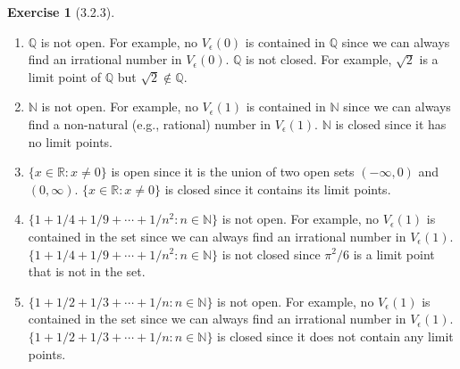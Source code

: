 \documentclass{amsart}
\theoremstyle{definition}
\newtheorem{exercise}{Exercise}
\newcommand{\N}{\mathbb{N}}
\newcommand{\Q}{\mathbb{Q}}
\newcommand{\R}{\mathbb{R}}
\newcommand{\st}{\mathrel{:}}
\begin{document}
\begin{exercise}[3.2.3]
  \begin{enumerate}[label={(\alph*)}]
    \item $\Q$ is not open. For example, no $V_\epsilon(0)$ is contained in $\Q$
      since we can always find an irrational number in $V_\epsilon(0)$. $\Q$ is
      not closed. For example, $\sqrt{2}$ is a limit point of $\Q$ but $\sqrt{2}
      \notin \Q$.
    \item $\N$ is not open. For example, no $V_\epsilon(1)$ is contained in $\N$
      since we can always find a non-natural (e.g., rational) number in
      $V_\epsilon(1)$. $\N$ is closed since it has no limit points.
    \item $\{x \in \R \st x \neq 0\}$ is open since it is the union of two open
      sets $(-\infty, 0)$ and $(0, \infty)$. $\{x \in \R \st x \neq 0\}$ is
      closed since it contains its limit points.
    \item $\{1 + 1/4 + 1/9 + \cdots + 1/n^2 \st n \in \N\}$ is not open. For
      example, no $V_\epsilon(1)$ is contained in the set since we can always
      find an irrational number in $V_\epsilon(1)$. $\{1 + 1/4 + 1/9 + \cdots +
      1/n^2 \st n \in \N\}$ is not closed since $\pi^2/6$ is a limit point that
      is not in the set.
    \item $\{1 + 1/2 + 1/3 + \cdots + 1/n \st n \in \N\}$ is not open. For
      example, no $V_\epsilon(1)$ is contained in the set since we can always
      find an irrational number in $V_\epsilon(1)$. $\{1 + 1/2 + 1/3 + \cdots +
      1/n \st n \in \N\}$ is closed since it does not contain any limit points.
  \end{enumerate}
\end{exercise}
\end{document}

